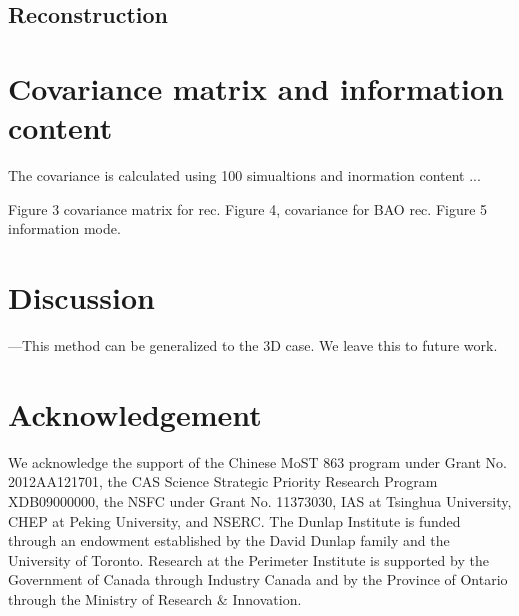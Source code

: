 \documentclass[aps,prd,twocolumn,showpacs,superscriptaddress,groupedaddress,nofootinbib]{revtex4}  %
\begin{document}
\subsection{Reconstruction}

\section{Covariance matrix and information content}

The covariance is calculated
using 100 simualtions and inormation content ...

Figure 3 covariance matrix for rec. Figure 4, covariance for BAO rec. Figure 5
information mode.

\section{Discussion}---This method can be generalized to the 3D case. We leave this
to future work.

\section{Acknowledgement}
We acknowledge the support of the Chinese MoST 863 program under Grant 
No. 2012AA121701, the CAS Science Strategic Priority Research Program 
XDB09000000, the NSFC under Grant No. 11373030, IAS at Tsinghua University, 
CHEP at Peking University, and NSERC.
The Dunlap Institute is funded through an endowment established by the David Dunlap family and the University of Toronto.
Research at the Perimeter Institute is supported by the Government of Canada
through Industry Canada and by the Province of Ontario through the Ministry of
Research $\&$ Innovation.



\end{document}
